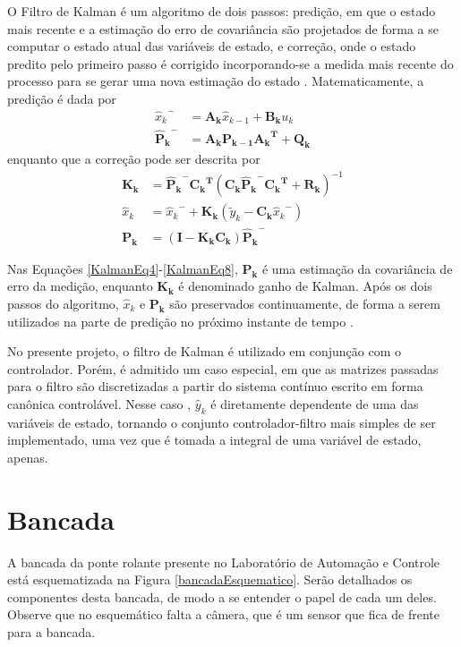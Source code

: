 O Filtro de Kalman é um algoritmo de dois passos: predição, em que o estado mais recente e a estimação do erro de covariância são projetados de forma a se computar o estado atual das variáveis de estado, e correção, onde o estado predito pelo primeiro passo é corrigido incorporando-se a medida mais recente do processo para se gerar uma nova estimação do estado \cite{GoddardKalman}. Matematicamente, a predição é dada por
\begin{align}
	\label{KalmanEq4} {\hat{x}_{k}}^{-} &= \mathbf{A_k} \hat{x}_{k-1} + \mathbf{B_k} u_k \\
	\label{KalmanEq5} \mathbf{{\hat{P}_{k}}^{-}} &= \mathbf{A_k}\mathbf{P_{k-1}}\mathbf{{A_k}^T} + \mathbf{Q_k}
\end{align}
 enquanto que a correção pode ser descrita por
\begin{align}
	\label{KalmanEq6} \mathbf{K_k} &= \mathbf{{\hat{P}_{k}}^{-}}\mathbf{{C_k}^T} {\left( \mathbf{C_k}\mathbf{{\hat{P}_{k}}^{-}}\mathbf{{C_k}^T} + \mathbf{R_k} \right)}^{-1} \\
	\label{KalmanEq7} \hat{x}_k &= {\hat{x}_{k}}^{-} + \mathbf{K_k} \left( \tilde{y}_k - \mathbf{C_k}{\hat{x}_{k}}^{-} \right) \\
	\label{KalmanEq8} \mathbf{P_k} &= \left( \mathbf{I} - \mathbf{K_k}\mathbf{C_k}\right)\mathbf{{\hat{P}_{k}}^{-}}
\end{align} 

Nas Equações \ref{KalmanEq4}-\ref{KalmanEq8}, $\mathbf{P_k}$ é uma estimação da covariância de erro da medição, enquanto $\mathbf{K_k}$ é denominado ganho de Kalman. Após os dois passos do algoritmo, $\hat{x}_k$ e $\mathbf{P_k}$ são preservados continuamente, de forma a serem utilizados na parte de predição no próximo instante de tempo \cite{GoddardKalman}.

No presente projeto, o filtro de Kalman é utilizado em conjunção com o controlador. Porém, é admitido um caso especial, em que as matrizes passadas para o filtro são discretizadas a partir do sistema contínuo escrito em forma canônica controlável. Nesse caso , $\hat{y}_k$ é diretamente dependente de uma das variáveis de estado, tornando o conjunto controlador-filtro mais simples de ser implementado, uma vez que é tomada a integral de uma variável de estado, apenas.

\section{Bancada\label{bancada}}
A bancada da ponte rolante presente no Laboratório de Automação e Controle está esquematizada na Figura \ref{bancadaEsquematico}. Serão detalhados os componentes desta bancada, de modo a se entender o papel de cada um deles. Observe que no esquemático falta a câmera, que é um sensor que fica de frente para a bancada. 

